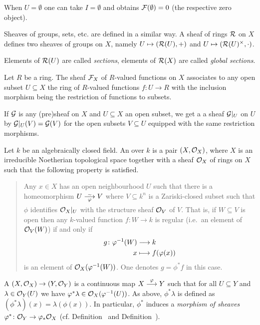 \documentclass[a4paper,parskip=half,numbers=enddot, DIV=12]{scrreprt}
\begin{document}
\begin{rem}
    When $U=\emptyset$ one can take $I=\emptyset$ and obtains $\mathcal{F}(\emptyset) = 0$ (the respective zero object).
\end{rem}
\begin{rem}
    Sheaves of groups, sets, etc. are defined in a similar way. A sheaf of rings $\mathcal{R}$ on $X$ defines two sheaves of groups on $X$, namely $U\mapsto (\mathcal{R}(U), +)$ and $U\mapsto (\mathcal{R}(U)^\times, \cdot)$.
\end{rem}
\begin{rem}
    Elements of $\mathcal{R}(U)$ are called \emph{sections}, elements of $\mathcal{R}(X)$ are called \emph{global sections}.
\end{rem}
\begin{example}
	    Let $R$ be a ring. The sheaf $\mathcal{F}_X$ of $R$-valued functions on $X$ associates to any open subset $U\subseteq X$ the ring of $R$-valued functions $f\colon U \to R$ with the inclusion morphism being the restriction of functions to subsets.
\end{example}
\begin{rem*}
	  If $\mathcal{G}$ is any (pre)sheaf on $X$ and $U\subseteq X$ an open subset, we get a a sheaf $\mathcal{G}|_U$ on $U$ by $\mathcal{G}|_U(V) = \mathcal{G}(V)$ for the open subsets $V\subseteq U$ equipped with the same restriction morphisms.
\end{rem*}
\begin{defi} 
	    Let $k$ be an algebraically closed field. An  over $k$ is a pair $(X,\mathcal{O}_X)$, where $X$ is an irreducible Noetherian topological space together with a sheaf $\mathcal{O}_X$ of rings on $X$ such that the following property is satisfied.
	    \begin{quote}
	        Any $x\in X$ has an open neighbourhood $U$ such that there is a homeomorphism $U\isomorphism[\phi] V$ where $V\subseteq k^n$ is a Zariski-closed subset such that $\phi$ identifies $\mathcal{O}_X|_U$ with the structure sheaf $\mathcal{O}_V$ of $V$. That is, if $W \subseteq V$ is open then any $k$-valued function $f\colon W\to k$ is regular (i.e.\ an element of $\mathcal{O}_V(W)$) if and only if 
	        \begin{align*}
	            g\colon \varphi^{-1}(W) &\longrightarrow k\\
	            x&\longmapsto f(\varphi(x))
	        \end{align*}
	        is an element of $\mathcal{O}_X(\varphi^{-1}(W))$. One denotes $g=\phi^*f$ in this case.
	    \end{quote}
	    A  $(X,\mathcal{O}_X) \to (Y,\mathcal{O}_Y)$ is a continuous map $X\morphism[\phi] Y$ such that for all $U\subseteq Y$ and $\lambda \in \mathcal{O}_Y(U)$ we have $\varphi^\ast \lambda \in \mathcal{O}_X(\varphi^{-1}(U))$. As above, $\phi^\ast\lambda$ is defined as $(\phi^\ast\lambda)(x) = \lambda(\phi(x))$. In particular, $\phi^*$ induces a \emph{morphism of sheaves} $\varphi^*\colon \mathcal{O}_Y\to\varphi_*\mathcal{O}_X$ (cf. Definition~ and Definition~).
	\end{defi}
\end{document}
